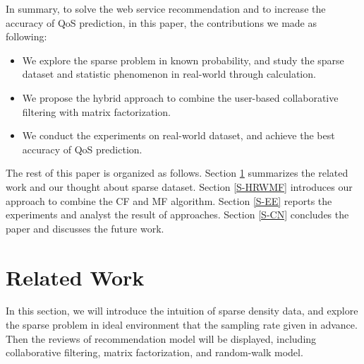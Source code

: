 \documentclass[conference]{IEEEtran}
\begin{document}
\par  In summary, to solve the web service recommendation and to increase the accuracy of QoS prediction, in this paper, the contributions we made as following:
\begin{itemize}
\item We explore the sparse problem in known probability, and study the sparse dataset and statistic phenomenon in real-world through calculation.
\item We propose the hybrid approach to combine the user-based collaborative filtering with matrix factorization.
\item We conduct the experiments on real-world dataset, and achieve the best accuracy of QoS prediction.
\end{itemize}

\par The rest of this paper is organized as follows. Section \ref{S-RW} summarizes the related work and our thought about sparse dataset. Section \ref{S-HRWMF} introduces our approach to combine the CF and MF algorithm. Section \ref{S-EE} reports the experiments and analyst the result of approaches. Section \ref{S-CN} concludes the paper and discusses the future work. 

\section{Related Work}\label{S-RW}
In this section, we will introduce the intuition of sparse density data, and explore the sparse problem in ideal environment that the sampling rate given in advance. Then the reviews of recommendation model will be displayed, including collaborative filtering, matrix factorization, and random-walk model.
\end{document}
